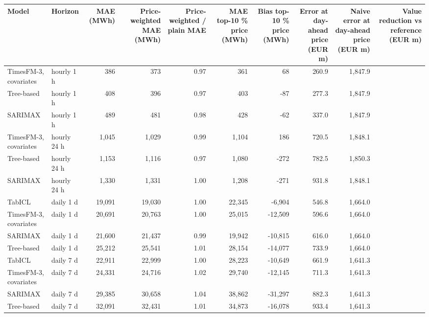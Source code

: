 \begin{tabular}{llrrrrrrrr}
\toprule
Model & Horizon & MAE (MWh) & Price-weighted MAE (MWh) & Price-weighted / plain MAE & MAE top-10 \% price (MWh) & Bias top-10 \% price (MWh) & Error at day-ahead price (EUR m) & Naive error at day-ahead price (EUR m) & Value reduction vs reference (EUR m) \\
\midrule
TimesFM-3, covariates & hourly 1 h & 386 & 373 & 0.97 & 361 & 68 & 260.9 & 1,847.9 &  \\
Tree-based & hourly 1 h & 408 & 396 & 0.97 & 403 & -87 & 277.3 & 1,847.9 &  \\
SARIMAX & hourly 1 h & 489 & 481 & 0.98 & 428 & -62 & 337.0 & 1,847.9 &  \\
TimesFM-3, covariates & hourly 24 h & 1,045 & 1,029 & 0.99 & 1,104 & 186 & 720.5 & 1,848.1 &  \\
Tree-based & hourly 24 h & 1,153 & 1,116 & 0.97 & 1,080 & -272 & 782.5 & 1,850.3 &  \\
SARIMAX & hourly 24 h & 1,330 & 1,331 & 1.00 & 1,208 & -271 & 931.8 & 1,848.1 &  \\
TabICL & daily 1 d & 19,091 & 19,030 & 1.00 & 22,345 & -6,904 & 546.8 & 1,664.0 &  \\
TimesFM-3, covariates & daily 1 d & 20,691 & 20,763 & 1.00 & 25,015 & -12,509 & 596.6 & 1,664.0 &  \\
SARIMAX & daily 1 d & 21,600 & 21,437 & 0.99 & 19,942 & -10,815 & 616.0 & 1,664.0 &  \\
Tree-based & daily 1 d & 25,212 & 25,541 & 1.01 & 28,154 & -14,077 & 733.9 & 1,664.0 &  \\
TabICL & daily 7 d & 22,911 & 22,999 & 1.00 & 28,223 & -10,649 & 661.9 & 1,641.3 &  \\
TimesFM-3, covariates & daily 7 d & 24,331 & 24,716 & 1.02 & 29,740 & -12,145 & 711.3 & 1,641.3 &  \\
SARIMAX & daily 7 d & 29,385 & 30,658 & 1.04 & 38,862 & -31,297 & 882.3 & 1,641.3 &  \\
Tree-based & daily 7 d & 32,091 & 32,431 & 1.01 & 34,873 & -16,078 & 933.4 & 1,641.3 &  \\
\bottomrule
\end{tabular}
